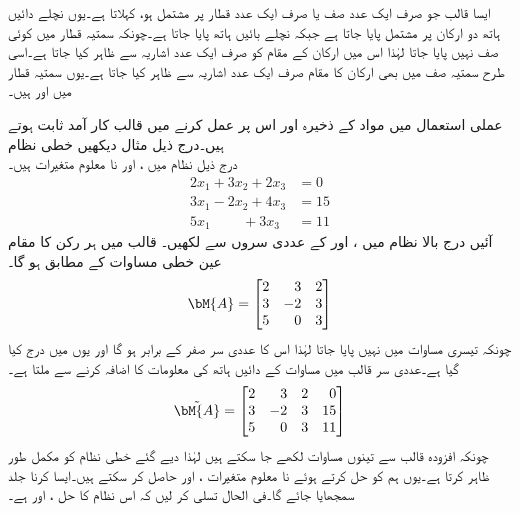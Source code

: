 ایسا قالب جو صرف ایک عدد صف یا صرف ایک عدد قطار پر مشتمل ہو،  کہلاتا ہے۔یوں نچلے دائیں ہاتھ دو ارکان پر مشتمل  پایا جاتا ہے جبکہ نچلے بائیں ہاتھ  پایا جاتا ہے۔چونکہ سمتیہ قطار میں کوئی صف نہیں پایا جاتا لہٰذا اس میں ارکان کے مقام کو صرف ایک عدد اشاریہ سے ظاہر کیا جاتا ہے۔اسی طرح سمتیہ صف میں بھی ارکان کا مقام صرف ایک عدد اشاریہ سے ظاہر کیا جاتا ہے۔یوں سمتیہ قطار میں  اور  ہیں۔

عملی استعمال میں مواد کے ذخیرہ اور اس پر عمل کرنے میں قالب کار آمد ثابت ہوتے ہیں۔درج ذیل مثال دیکھیں
\quad خطی نظام\\
درج ذیل  نظام میں ،  اور  نا معلوم متغیرات ہیں۔ 
\begin{align*}
2x_1+3x_2+2x_3&=0\\
3x_1-2x_2+4x_3&=15\\
5x_1\phantom{+3x_2}+3x_3&=11
\end{align*}
آئیں درج بالا نظام میں ،  اور  کے عددی سروں سے    لکھیں۔  قالب میں ہر رکن کا مقام عین خطی مساوات کے مطابق ہو گا۔
\begin{align*}
\bM{A}=
\begin{bmatrix*}[r]
2&3&2\\
3&-2&3\\
5&0&3
\end{bmatrix*}
\end{align*} 
چونکہ تیسری مساوات میں  نہیں پایا جاتا لہٰذا اس کا عددی سر صفر کے برابر ہو گا اور یوں  میں  درج کیا گیا ہے۔عددی سر قالب  میں مساوات کے دائیں ہاتھ کی معلومات کا اضافہ کرنے سے   ملتا ہے۔
\begin{align*}
\tilde{\bM{A}}=
\begin{bmatrix*}[r]
2&3&2& 0\\
3&-2&3& 15\\
5&0&3&11
\end{bmatrix*}
\end{align*}
چونکہ افزودہ قالب  سے تینوں مساوات لکھے جا سکتے ہیں لہٰذا دیے گئے خطی نظام کو  مکمل طور ظاہر کرتا ہے۔یوں ہم  کو حل کرتے ہوئے نا معلوم متغیرات ،  اور  حاصل کر سکتے ہیں۔ایسا کرنا جلد سمجھایا جائے گا۔فی الحال تسلی کر لیں کہ اس نظام کا حل ،  اور  ہے۔

